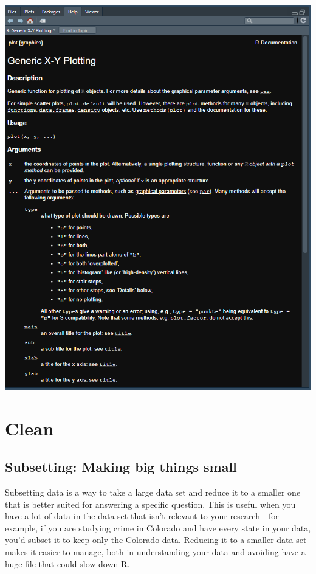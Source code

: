 \documentclass[
  12pt,
]{book}
\begin{document}
\includegraphics{images/help_page.PNG}

\hypertarget{part-clean}{%
\part{Clean}\label{part-clean}}

\hypertarget{subsetting-intro}{%
\chapter{Subsetting: Making big things small}\label{subsetting-intro}}

Subsetting data is a way to take a large data set and reduce it to a smaller one that is better suited for answering a specific question. This is useful when you have a lot of data in the data set that isn't relevant to your research - for example, if you are studying crime in Colorado and have every state in your data, you'd subset it to keep only the Colorado data. Reducing it to a smaller data set makes it easier to manage, both in understanding your data and avoiding have a huge file that could slow down R.
\end{document}
